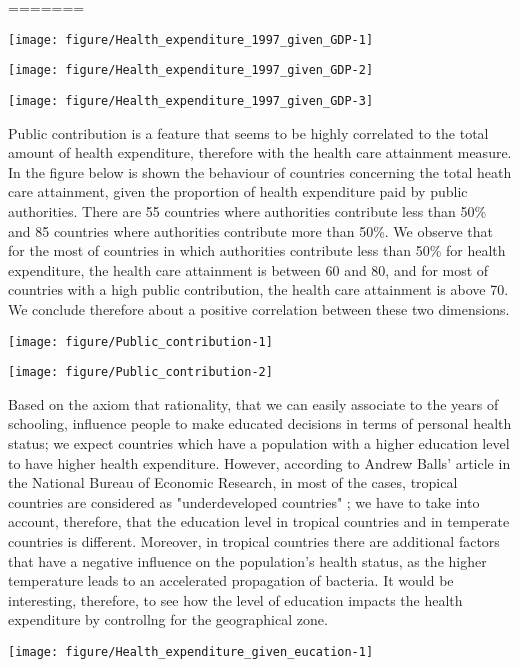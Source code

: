 \documentclass[12pt,a4paper]{article}\usepackage[]{graphicx}\usepackage[]{color}
\makeatletter
\def\maxwidth{ %
  \ifdim\Gin@nat@width>\linewidth
    \linewidth
  \else
    \Gin@nat@width
  \fi
}
\makeatother
\begin{document}
=======

\texttt{[image: figure/Health\_expenditure\_1997\_given\_GDP-1]} 

\texttt{[image: figure/Health\_expenditure\_1997\_given\_GDP-2]} 

\texttt{[image: figure/Health\_expenditure\_1997\_given\_GDP-3]} 


Public contribution is a feature that seems to be highly correlated to the total amount of health expenditure, therefore with the health care attainment measure. In the figure below is shown the behaviour of countries concerning the total heath care attainment, given the proportion of health expenditure paid by public authorities.  There are 55 countries where authorities contribute less than 50\% and 85 countries where authorities contribute more than 50\%. We observe that for the most of countries in which authorities contribute less than 50\% for health expenditure, the health care attainment is between 60 and 80, and for most of countries with a high public contribution, the health care attainment is above 70. We conclude therefore about a positive correlation between these two dimensions.

\texttt{[image: figure/Public\_contribution-1]} 

\texttt{[image: figure/Public\_contribution-2]} 



Based on the axiom that  rationality, that we can easily associate to the years of schooling, influence people to make educated decisions in terms of personal health status; we expect countries which have a population with a higher education level to have higher health expenditure. However, according to Andrew Balls' article in the National Bureau of Economic Research, in most of the cases, tropical countries are considered as "underdeveloped countries" ; we have to take into account, therefore,  that the education level in tropical countries and in temperate  countries is different. Moreover, in tropical countries there are additional factors that have a negative influence on the population's health status, as the higher temperature leads to an accelerated propagation of bacteria.  It would be interesting, therefore, to see how the level of education impacts the health expenditure by controllng for the geographical zone.


\texttt{[image: figure/Health\_expenditure\_given\_eucation-1]} 
\end{document}
